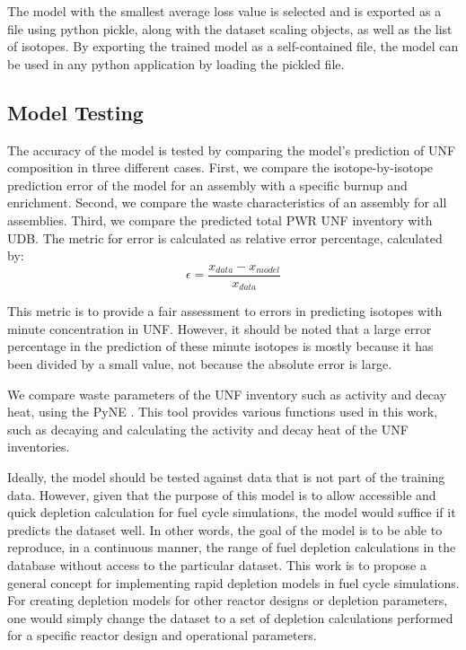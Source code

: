 The model with the smallest average loss value
is selected and is exported as a file using python
pickle, along with the dataset scaling objects, as well as
the list of isotopes. By exporting the trained model
as a self-contained file, the model can be used in any python
application by loading the pickled file.


\subsection{Model Testing}

The accuracy of the model is tested by comparing
the model's prediction of \gls{UNF} composition
in three different cases. First, we compare the
isotope-by-isotope prediction error of the model for an
assembly with a specific burnup and enrichment.
Second, we compare the waste characteristics of
an assembly for all assemblies. Third, we compare
the predicted total \gls{PWR} \gls{UNF} inventory with
\gls{UDB}. The metric for error is calculated as
relative error percentage, calculated by:
\begin{equation}
\epsilon = \frac{x_{data} - x_{model}}{x_{data}}
\end{equation}

This metric is to provide a fair assessment to errors
in predicting isotopes with minute concentration in \gls{UNF}.
However, it should be noted that a large error percentage in the
prediction of these minute isotopes is mostly because it has been
divided by a small value, not because the absolute error is large.

We compare waste parameters of the \gls{UNF} inventory
such as activity and decay heat, using the
\gls{PyNE} \cite{scopatz_pyne:_2012}. This tool provides
various functions used
in this work, such as decaying and calculating
the activity and decay heat of the \gls{UNF} inventories.

Ideally, the model should be tested against data
that is not part of the training data. However, given
that the purpose of this model is to allow accessible and
quick depletion calculation for
fuel cycle simulations, the model would suffice if
it predicts the dataset well. In other words, the
goal of the model is to be able to reproduce,
in a continuous manner, the range of fuel depletion
calculations in the database without access to the particular dataset.
This work
is to propose a general concept for implementing
rapid depletion models in fuel cycle simulations.
For creating depletion models for other reactor designs or depletion parameters,
one would simply change the dataset to a set of depletion calculations performed
for a specific reactor design and operational parameters.


